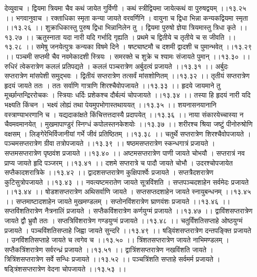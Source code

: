 \documentclass[11pt]{book}
\begin{document}
\begin{landscape}
देव्युवाच ।
द्वियमा त्रियमा चैव कथं जायेत गुर्विणी ।
कथं स्त्रीद्वियमा जायेत्कथं वा पुरुषद्वयम् ।।१३.२५ ।।
भगवानुवाच ।
रक्ताधिका स्मृता कन्या जायते वरवर्णिनि ।
वायुना च द्विधा भिन्ना कन्यकद्वियमा स्मृता ।।१३.२६ ।।
शुक्राधिकास्तु पुरुष द्विधा भिन्नानिलेन तु ।
द्वियमा पुरुषो ज्ञेया त्रियमास्तु त्रिधा कृते ।।१३.२७ ।।
ऋतुस्नाता यदा नारी यदि गर्भादि गृह्यति ।
प्रथमे च द्वितीये च तृतीये च स जीवति ।।१३.२८ ।।
समेषु जनयेत्पुत्रः कन्यका विषमे दिने ।
षष्ट्याष्टमौ च दशमी द्वादशी च पुमान्भवेत् ।।१३.२९ ।।
पञ्चमी सप्तमी चैव नवमेकादशी स्त्रियः ।
समरक्ते च शुक्रे च श्यामः संजायते पुमान् ।।१३.३० ।।
रुधिरं त्वेकरात्रेण कललं प्रतिपद्यते ।
कललं पञ्चरात्रेण अर्बुदत्वं प्रजायते ।।१३.३१ ।।
अर्बुदः सप्तरात्रेण मांसपेशी समुद्भवः ।
द्वितीयं सप्तरात्रेण तत्सर्वं मांसशोणितम् ।।१३.३२ ।।
तृतीयं सप्तरात्रेण हृदयं जायते ततः ।
ततः सर्वाणि गात्राणि शिरश्चैवोपजायते ।।१३.३३ ।।
हृदये जायमाने तु मूर्च्छान्तन्द्रिररोचकः ।
स्त्रियाः धर्दिः प्रशेकश्च दौर्बल्यं चोपजायते ।।१३.३४ ।।
तस्या हि हृदयं नारी यदि भक्ष्यति किंचन ।
भक्ष्यं लोह्यं तथा पेयमुपभोगास्तथाययत् ।।१३.३५ ।।
शयनासनयानानि वस्त्राण्याभरणानि च ।
यद्यदाकांक्षते किंचित्तत्तदास्यै प्रदापयेत् ।।१३.३६ ।।
नाया संकारयेच्चास्या न चैवमवमानयेत् ।
मुखमापाण्डुरं स्निग्धं कपोलस्तनकेशयोः ।।१३.३७ ।।
शरीरश्च श्रिया जष्टुं पीनोरुश्रोणि वक्षसम् ।
लिङ्गेरेभिर्विजानीयां गर्भे जीवं प्रतिष्ठितम् ।।१३.३८ ।।
चतुर्थे सप्तरात्रेण शिरश्चैवोपजायते ।
पञ्चमसप्तरात्रेण ग्रीवा तत्रोपजायते ।।१३.३९ ।।
षष्ठमसप्तरात्रेण स्कन्धगात्रं प्रजायते ।
सप्तमसप्तरात्रेण पृष्ठवंश प्रजायते ।।१३.४० ।।
अष्टमसप्तरात्रेण पाणी जायते चोभयौ ।
सप्तरात्रं नव प्राप्य जायते हृदि पञ्जरम् ।।१३.४१ ।।
दशमे सप्तरात्रे च पादौ जायते चोभौ ।
उदरश्चोपजायेत सप्तैकादशरात्रिके ।।१३.४२ ।।
द्वादशसप्तरात्रेण कुक्षिपार्श्वेः प्रजायते ।
सप्तत्रैदशरात्रेण कुटिसुत्रोपजायते ।।१३.४३ ।।
नवत्यष्टमरातेण जायते सूत्रविंशति ।
सप्तपञ्चदशाहेन सर्वमेदः प्रजायते ।।१३.४४ ।।
षोडशसप्तरात्रेण अथिसर्वाणि जायते ।
सप्तसप्तदशाहेन जायते स्नायुबन्धनम् ।।१३.४५ ।।
सप्तमाष्टादशाहेन जायते मुखमण्डलम् ।
सप्तोनविंशरात्रेण घ्राणवंशः प्रजायते ।।१३.४६ ।।
सप्तविंशतिरात्रेण नैत्रनालिं प्रजायते ।
सप्तैकविंशरात्रेण कर्णयुग्मं प्रजायते ।।१३.४७ ।।
द्वाविंशसप्तरात्रेण जायते द्वौ भ्रुवौ ततः ।
सप्तत्रिविंशरात्रेण गण्डयुग्मं प्रजायते ।।१३.४८ ।।
चतुर्विंशतिसप्ताहे ओष्ठयुग्मं प्रजायते ।
पञ्चविंशतिसप्ताहे जिह्वा जायते सुन्दरि ।।१३.४९ ।।
षड्विंशसप्तरात्रेण दन्तपङ्क्ति प्रजायते ।
उनविंशतिसप्ताहे जायते च त्वगेव च ।।१३.५० ।।
त्रिंशतसप्तरात्रेण जायते नाभिमण्डलम् ।
सप्तैकत्रिंशरात्रेण सर्वरन्ध्रं प्रजायते ।।१३.५१ ।।
द्वात्रिंशसप्तरात्रेण नखविंशति जायते ।
त्रित्रिंशसप्तरात्रेण सर्वे सन्धिः प्रजायते ।।१३.५२ ।।
पञ्चत्रिंशति सप्ताहे सर्वमर्म प्रजायते ।
षड्त्रिंशसप्तरात्रेण वेदना चोपजायते ।।१३.५३ ।।

\end{landscape}
\end{document}
